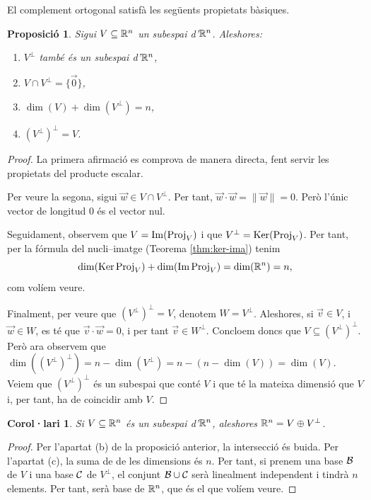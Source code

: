 \documentclass[
  11pt,
]{book}
\numberwithin{dummy}{section}
\theoremstyle{maincolornumbox}
\theoremstyle{blacknumex}
\theoremstyle{blacknumbox}
\newtheorem{corollaryT}{Corol·lari}[chapter]
\theoremstyle{maincolornum}
\newtheorem{propositionT}{Proposició}[chapter]
\newenvironment{proposition}{\begin{pBox}\begin{propositionT}}{\end{propositionT}\end{pBox}}
\newenvironment{corollary}{\begin{cBox}\begin{corollaryT}}{\end{corollaryT}\end{cBox}}
\newlength\esp
\begin{document}
El complement ortogonal satisfà les següents propietats bàsiques.

\begin{proposition}

Sigui \(V\subseteq \mathbb{R}^n\) un subespai d'\(\mathbb{R}^n\). Aleshores:

\begin{enumerate}
\def\labelenumi{\arabic{enumi}.}
\item
  \(V^\perp\) també és un subespai d'\(\mathbb{R}^n\),
\item
  \(V \cap V^\perp = \{\vec 0\}\),
\item
  \(\dim(V)+\dim(V^\perp) = n\),
\item
  \((V^\perp)^\perp = V\).
\end{enumerate}

\end{proposition}

\begin{proof}
La primera afirmació es comprova de manera directa, fent servir
les propietats del producte escalar.

Per veure la segona, sigui \(\vec w\in V\cap V^\perp\). Per tant,
\(\vec w\cdot\vec w =\| \vec w\|= 0\). Però l'únic vector de longitud \(0\)
és el vector nul.

Seguidament, observem que \(V=\operatorname{Im}(\operatorname{Proj}_V)\) i que
\(V^\perp = \operatorname{Ker}(\operatorname{Proj}_V)\). Per tant, per la fórmula del nucli--imatge
(Teorema \ref{thm:ker-ima}) tenim
\[\dim(\operatorname{Ker}\operatorname{Proj}_V) + \dim(\operatorname{Im}\operatorname{Proj}_V) = \dim(\mathbb{R}^n)=n,\] com volíem
veure.

Finalment, per veure que \((V^\perp)^\perp = V\), denotem \(W=V^\perp\).
Aleshores, si \(\vec v\in V\), i \(\vec w\in W\), es té que
\(\vec v\cdot \vec w = 0\), i per tant \(\vec v\in W^\perp\). Concloem doncs
que \(V\subseteq (V^\perp)^\perp\). Però ara observem que
\(\dim((V^\perp)^\perp) = n - \dim(V^\perp) = n- (n-\dim(V)) = \dim(V)\).
Veiem que \((V^\perp)^\perp\) és un subespai que conté \(V\) i que té la
mateixa dimensió que \(V\) i, per tant, ha de coincidir amb \(V\).
\end{proof}

\begin{corollary}
\protect\hypertarget{cor:V-Vper}{}\label{cor:V-Vper}Si \(V\subseteq\mathbb{R}^n\) és un subespai
d'\(\mathbb{R}^n\), aleshores \(\mathbb{R}^n=V\oplus V^\perp\).
\end{corollary}

\begin{proof}
Per l'apartat (b) de la proposició anterior, la intersecció és
buida. Per l'apartat (c), la suma de de les dimensions és \(n\). Per tant,
si prenem una base \(\mathcal{B}\) de \(V\) i una base \(\mathcal{C}\) de \(V^\perp\), el
conjunt \(\mathcal{B}\cup\mathcal{C}\) serà linealment independent i tindrà \(n\)
elements. Per tant, serà base de \(\mathbb{R}^n\), que és el que volíem veure.
\end{proof}
\end{document}
